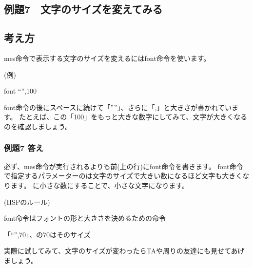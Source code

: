 \clearpage

\subsection{例題7　文字のサイズを変えてみる}

\subsection*{考え方}

mes命令で表示する文字のサイズを変えるにはfont命令を使います。

\begin{description}
    \item (例)
    \item font “”,100
\end{description}

font命令の後にスペースに続けて「””」、さらに「,」と大きさが書かれています。
たとえば、この「100」をもっと大きな数字にしてみて、文字が大きくなるのを確認しましょう。

\subsubsection*{例題7 答え}

必ず、mes命令が実行されるよりも前(上の行)にfont命令を書きます。
font命令で指定するパラメーターのは文字のサイズで大きい数になるほど文字も大きくなります。
に小さな数にすることで、小さな文字になります。

\begin{description}
    \item (HSPのルール)
\end{description}

\begin{description}
    \item font命令はフォントの形と大きさを決めるための命令
    \item 「“”,70」、の70はそのサイズ
\end{description}

実際に試してみて、文字のサイズが変わったらTAや周りの友達にも見せてあげましょう。

